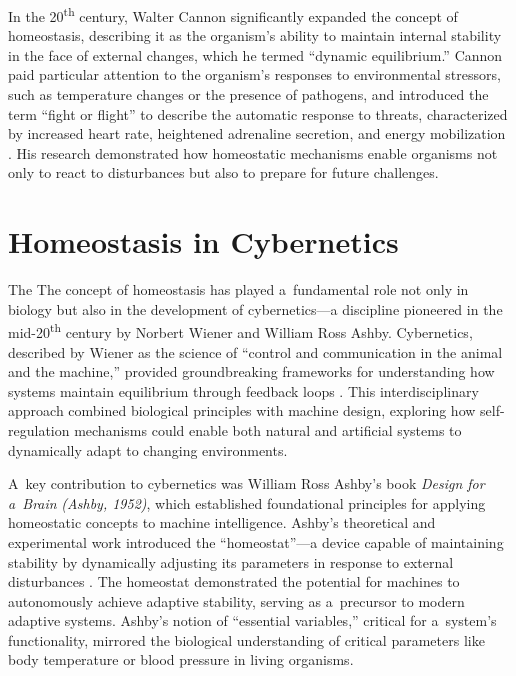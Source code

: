 \documentclass[%
  manuscript=article,
  year=2024,
  volume=77,
  doi=10.59203/zfn.77.706,
]{zfn}
\begin{document}
In the 20\textsuperscript{th} century, Walter Cannon significantly expanded the concept of homeostasis, describing it as the organism's ability to maintain internal stability in the face of external changes, which he termed ``dynamic equilibrium.'' Cannon paid particular attention to the organism's responses to environmental stressors, such as temperature changes or the presence of pathogens, and introduced the term ``fight or flight'' to describe the automatic response to threats, characterized by increased heart rate, heightened adrenaline secretion, and energy mobilization 
\parencite[][]{modell_physiologists_2015}. %
 His research demonstrated how homeostatic mechanisms enable organisms not only to react to disturbances but also to prepare for future challenges.



\section*{Homeostasis in Cybernetics}

The The concept of homeostasis has played a~fundamental role not only in biology but also in the development of cybernetics---a discipline pioneered in the mid-20\textsuperscript{th} century by Norbert Wiener and William Ross Ashby. Cybernetics, described by Wiener as the science of ``control and communication in the animal and the machine,'' provided groundbreaking frameworks for understanding how systems maintain equilibrium through feedback loops 
\parencite[][]{wiener_cybernetics_1965}. %
 This interdisciplinary approach combined biological principles with machine design, exploring how self-regulation mechanisms could enable both natural and artificial systems to dynamically adapt to changing environments.



A~key contribution to cybernetics was William Ross Ashby's book \textit{Design for a~Brain} \label{ref:RND4QBhH4WIOz}\textit{(Ashby, 1952)}, which established foundational principles for applying homeostatic concepts to machine intelligence. Ashby's theoretical and experimental work introduced the ``homeostat''---a device capable of maintaining stability by dynamically adjusting its parameters in response to external disturbances 
\parencite[][]{ashby_design_1952}. %
 The homeostat demonstrated the potential for machines to autonomously achieve adaptive stability, serving as a~precursor to modern adaptive systems. Ashby's notion of ``essential variables,'' critical for a~system's functionality, mirrored the biological understanding of critical parameters like body temperature or blood pressure in living organisms.
\end{document}
